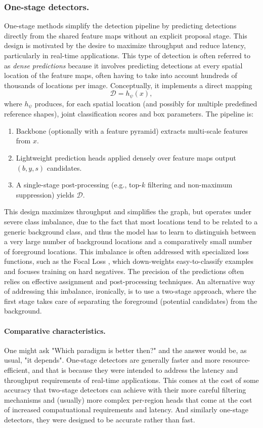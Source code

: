 \subsubsection{One-stage detectors.}
One-stage methods simplify the detection pipeline by predicting detections directly from the shared feature maps without an explicit proposal stage. This design is motivated by the desire to maximize throughput and reduce latency, particularly in real-time applications. This type of detection is often referred to as \emph{dense predictions} because it involves predicting detections at every spatial location of the feature maps, often having to take into account hundreds of thousands of locations per image.
Conceptually, it implements a direct mapping
$$
\mathcal{D} = h_{\psi}(x),
$$
where $h_{\psi}$ produces, for each spatial location (and possibly for multiple predefined reference shapes), joint classification scores and box parameters. The pipeline is:
\begin{enumerate}
    \item Backbone (optionally with a feature pyramid) extracts multi-scale features from $x$.
    \item Lightweight prediction heads applied densely over feature maps output $(b, y, s)$ candidates.
    \item A single-stage post-processing (e.g., top-$k$ filtering and non-maximum suppression) yields $\mathcal{D}$.
\end{enumerate}
This design maximizes throughput and simplifies the graph, but operates under severe class imbalance, due to the fact that most locations tend to be related to a generic background class, and thus the model has to learn to distinguish between a very large number of background locations and a comparatively small number of foreground locations. This imbalance is often addressed with specialized loss functions, such as the Focal Loss \cite{lin2018focalloss}, which down-weights easy-to-classify examples and focuses training on hard negatives.
The precision of the predictions often relies on effective assignment and post-processing techniques.
An alternative way of addressing this imbalance, ironically, is to use a two-stage approach, where the first stage takes care of separating the foreground (potential candidates) from the background.

\paragraph{Comparative characteristics.}
One might ask "Which paradigm is better then?" and the answer would be, as usual, "it depends". One-stage detectors are generally faster and more resource-efficient, and that is because they were intended to address the latency and throughput requirements of real-time applications. This comes at the cost of some accuracy that two-stage detectors can achieve with their more careful filtering mechanisms and (usually) more complex per-region heads that come at the cost of increased compatuational requirements and latency. And similarly one-stage detectors, they were designed to be accurate rather than fast.

